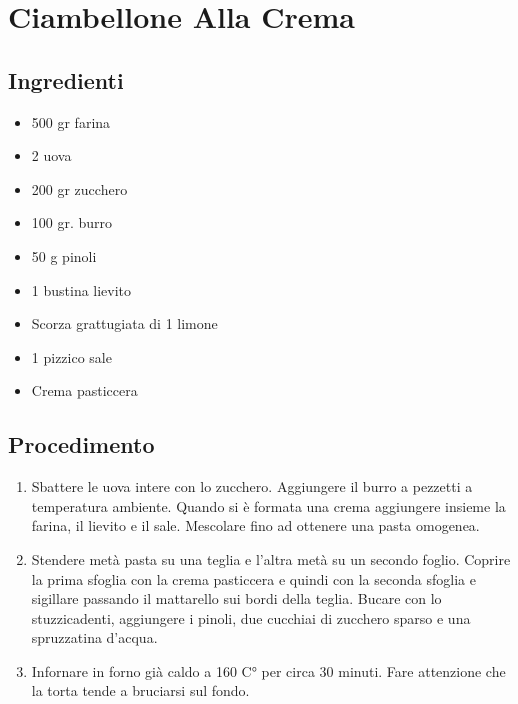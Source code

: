 \section{Ciambellone Alla Crema}
\subsection{Ingredienti}
\begin{itemize}
\item 500 gr farina  
\item 2 uova  
\item 200 gr zucchero  
\item 100 gr. burro  
\item 50 g pinoli  
\item 1 bustina lievito  
\item Scorza grattugiata di 1 limone  
\item 1 pizzico sale  
\item Crema pasticcera
\end{itemize}
\subsection{Procedimento}
\begin{enumerate}
\item  Sbattere le uova intere con lo zucchero. Aggiungere il burro a pezzetti a temperatura ambiente. Quando si è formata una crema aggiungere insieme la farina, il lievito e il sale. Mescolare fino ad ottenere una pasta omogenea.  
\item  Stendere metà pasta su una teglia e l'altra metà su un secondo foglio. Coprire la prima sfoglia con la crema pasticcera e quindi con la seconda sfoglia e sigillare passando il mattarello sui bordi della teglia. Bucare con lo stuzzicadenti, aggiungere i pinoli, due cucchiai di zucchero sparso e una spruzzatina d'acqua.  
\item  Infornare in forno già caldo a 160 C° per circa 30 minuti. Fare attenzione che la torta tende a bruciarsi sul fondo.
\end{enumerate}
